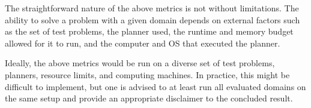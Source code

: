 \documentclass{article}
\theoremstyle{definition}
\theoremstyle{remark}
\newcommand{\commentout}[1]{ }
\newcommand{\realm}{{\ensuremath{M^*}}\xspace}
\newif\ifaddcomments
\newcommand{\roni}[1]{\ifaddcomments{\textcolor{red}{[Roni: #1]}}\fi}
\newcommand{\mauro}[1]{\ifaddcomments{\textcolor{green}{[Mauro: #1]}}\fi}
\newcommand{\gregor}[1]{\ifaddcomments{\textcolor{orange}{[Gregor: #1]}}\fi}
\newcommand{\cm}[1]{\ifaddcomments{\textcolor{olive}{[Christian: #1]}}\fi}
\begin{document}
The straightforward nature of the above metrics is not without limitations. The ability to solve a problem with a given domain depends on external factors such as the set of test problems, the planner used, the runtime and memory budget allowed for it to run, and the computer and OS that executed the planner.
\gregor{Theorem provers and proof assistants, e.g., Lean, sometimes use ``heartbearts'' (\url{https://florisvandoorn.com/carleson/docs/Lean/Util/Heartbeats.html}) instead of time. They measure elementary orations and bound their number. This ensures reproducibility across different machines. For us this could e.g.\ be number of expanded states. Or the number of times an effect is applied -- this would also include computation effort for heuristics.}
\roni{I am not sure I fully understand. I know that in search people often count nodes expanded instead (or in addition to) time because expanded nodes is less affected by what the OS is doing. But doing something similar here is not trivial, I think?}
Ideally, the above metrics would be run on a diverse set of test problems, planners, resource limits, and computing machines. In practice, this might be difficult to implement, but one is advised to at least run all evaluated domains on the same setup and provide an appropriate disclaimer to the concluded result. 

\end{document}
